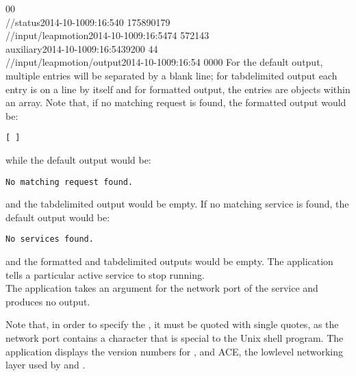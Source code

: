 0\pseudotab{}0\\
/\dollarService/status\pseudotab{}2014-10-10\pseudotab{}09:16:54\pseudotab{}0%
\pseudotab{}17589\pseudotab{}0\pseudotab{}179\\
/\serviceName/input/leapmotion\pseudotab{}2014-10-10\pseudotab{}09:16:54\pseudotab{}74%
\pseudotab{}5721\pseudotab{}4\pseudotab{}3\\
auxiliary\pseudotab{}2014-10-10\pseudotab{}09:16:54\pseudotab{}39\pseudotab{}200%
\pseudotab{}4\pseudotab{}4\\
/\serviceName/input/leapmotion/output\pseudotab{}2014-10-10\pseudotab{}09:16:54%
\pseudotab{}0\pseudotab{}0\pseudotab{}0\pseudotab{}0
\outputEnd{}
For the default output, multiple entries will be separated by a blank line; for
tab\longDash{}delimited output each entry is on a line by itself and for
\json\longDash{}formatted output, the entries are objects within an array.
Note that, if no matching request is found, the \json\longDash{}formatted output would be:
\outputBegin
\begin{verbatim}
[ ]
\end{verbatim}
\outputEnd{}
while the default output would be:
\outputBegin
\begin{verbatim}
No matching request found.
\end{verbatim}
\outputEnd{}
and the tab\longDash{}delimited output would be empty.
If no matching service is found, the default output would be:
\outputBegin
\begin{verbatim}
No services found.
\end{verbatim}
\outputEnd{}
and the \json\longDash{}formatted and tab\longDash{}delimited outputs would be empty.
\condPage
{}
The application  tells a particular active service to stop
running.\\

The application takes an argument for the \yarp{} network port of the service and produces
no output.
\insertShortUtilityParameters{}

Note that, in order to specify the , it must be quoted
with single quotes, as the network port contains a character that is special to the Unix
shell program.
The application  displays the version numbers for \mplusm,
\yarp{} and ACE, the low\longDash{}level networking layer used by \mplusm{} and \yarp.\\


